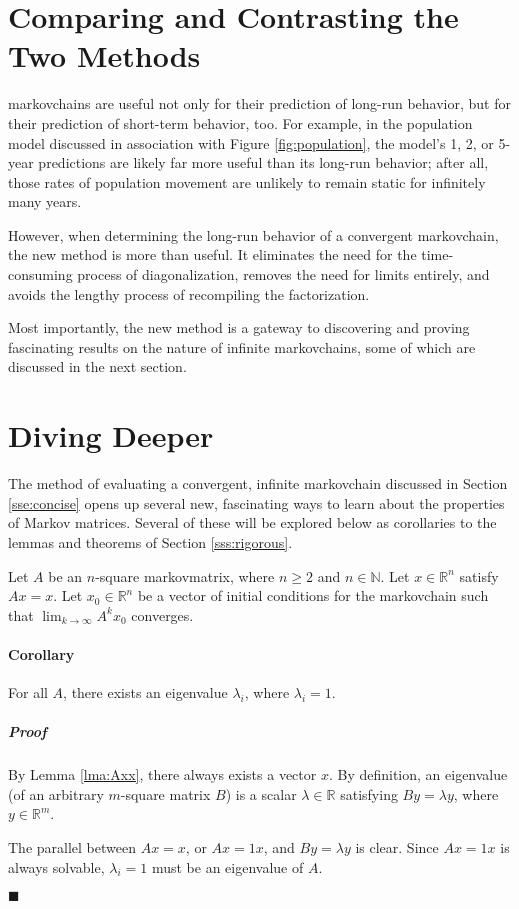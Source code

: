 \documentclass[titlepage]{article}
\newcounter{lemma}
\newcounter{theorem}
\newcounter{corollary}
\newenvironment{corollary}[2]{
    \setenumerate{itemindent=15pt}
    \refstepcounter{corollary}\label{#1}
    \paragraph{Corollary \thecorollary}\hangindent=15pt #2

    \setlength{\leftskip}{15pt}
    \subparagraph{\hspace{-15pt}Proof}
}{

    \setlength{\leftskip}{0pt}
    \qed
}
\newcommand{\qed}{
    \begin{flushright}
        $\blacksquare$
    \end{flushright}
}
\newcommand{\R}{\mathbb{R}}
\newcommand{\N}{\mathbb{N}}
\begin{document}
\section{Comparing and Contrasting the Two Methods}
\Glspl{markovchain} are useful not only for their prediction of long-run behavior, but for their prediction of short-term behavior, too. For example, in the population model discussed in association with Figure \ref{fig:population}, the model's 1, 2, or 5-year predictions are likely far more useful than its long-run behavior; after all, those rates of population movement are unlikely to remain static for infinitely many years.\par
However, when determining the long-run behavior of a convergent \Gls{markovchain}, the new method is more than useful. It eliminates the need for the time-consuming process of diagonalization, removes the need for limits entirely, and avoids the lengthy process of recompiling the factorization.\par
Most importantly, the new method is a gateway to discovering and proving fascinating results on the nature of infinite \Glspl{markovchain}, some of which are discussed in the next section.
\newpage



\section{Diving Deeper}
The method of evaluating a convergent, infinite \Gls{markovchain} discussed in Section \ref{sse:concise} opens up several new, fascinating ways to learn about the properties of Markov matrices. Several of these will be explored below as corollaries to the lemmas and theorems of Section \ref{sss:rigorous}.\par
Let $A$ be an $n$-square \Gls{markovmatrix}, where $n\geq 2$ and $n\in\N$. Let $x\in\R^n$ satisfy $Ax=x$. Let $x_0\in\R^n$ be a vector of initial conditions for the \Gls{markovchain} such that $\lim_{k\to\infty}A^kx_0$ converges.

\begin{corollary}{cly:1iseigenvalue}{
    For all $A$, there exists an eigenvalue $\lambda_i$, where $\lambda_i=1$.
}
    By Lemma \ref{lma:Axx}, there always exists a vector $x$. By definition, an eigenvalue (of an arbitrary $m$-square matrix $B$) is a scalar $\lambda\in\R$ satisfying $By=\lambda y$, where $y\in\R^m$.\par
    The parallel between $Ax=x$, or $Ax=1x$, and $By=\lambda y$ is clear. Since $Ax=1x$ is always solvable, $\lambda_i=1$ must be an eigenvalue of $A$.
\end{corollary}
\end{document}
